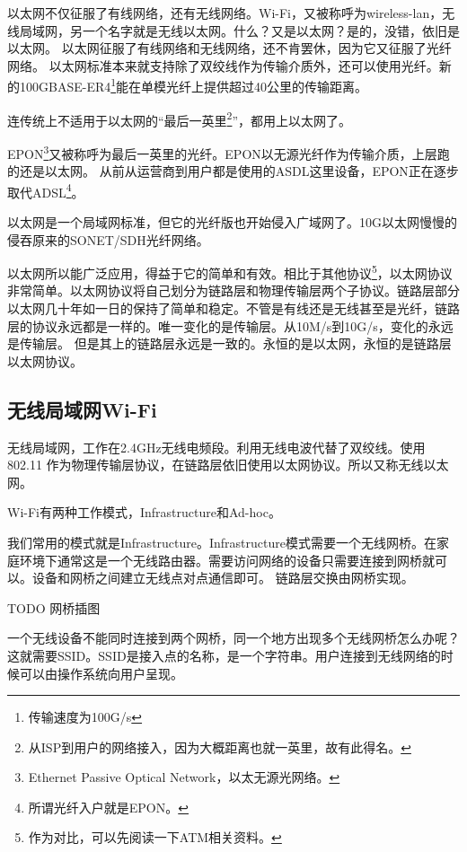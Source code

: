 以太网不仅征服了有线网络，还有无线网络。Wi-Fi，又被称呼为wireless-lan，无线局域网，另一个名字就是无线以太网。什么？又是以太网？是的，没错，依旧是以太网。
以太网征服了有线网络和无线网络，还不肯罢休，因为它又征服了光纤网络。
以太网标准本来就支持除了双绞线作为传输介质外，还可以使用光纤。新的100GBASE-ER4\footnote{传输速度为100G/s}能在单模光纤上提供超过40公里的传输距离。

连传统上不适用于以太网的“最后一英里\footnote{从ISP到用户的网络接入，因为大概距离也就一英里，故有此得名。}”，都用上以太网了。

EPON\footnote{Ethernet Passive Optical Network，以太无源光网络。}又被称呼为最后一英里的光纤。EPON以无源光纤作为传输介质，上层跑的还是以太网。
从前从运营商到用户都是使用的ASDL这里设备，EPON正在逐步取代ADSL\footnote{所谓光纤入户就是EPON。}。%

以太网是一个局域网标准，但它的光纤版也开始侵入广域网了。10G以太网慢慢的侵吞原来的SONET/SDH光纤网络。

以太网所以能广泛应用，得益于它的简单和有效。相比于其他协议\footnote{作为对比，可以先阅读一下ATM相关资料。}，以太网协议非常简单。以太网协议将自己划分为链路层和物理传输层两个子协议。链路层部分以太网几十年如一日的保持了简单和稳定。不管是有线还是无线甚至是光纤，链路层的协议永远都是一样的。唯一变化的是传输层。从10M/s到10G/s，变化的永远是传输层。
但是其上的链路层永远是一致的。永恒的是以太网，永恒的是链路层以太网协议。

\subsection{无线局域网Wi-Fi}

无线局域网，工作在2.4GHz无线电频段。利用无线电波代替了双绞线。使用 802.11 作为物理传输层协议，在链路层依旧使用以太网协议。所以又称无线以太网。

Wi-Fi有两种工作模式，Infrastructure和Ad-hoc。

我们常用的模式就是Infrastructure。Infrastructure模式需要一个无线网桥。在家庭环境下通常这是一个无线路由器。需要访问网络的设备只需要连接到网桥就可以。设备和网桥之间建立无线点对点通信即可。
链路层交换由网桥实现。

TODO 网桥插图 %

一个无线设备不能同时连接到两个网桥，同一个地方出现多个无线网桥怎么办呢？这就需要SSID。SSID是接入点的名称，是一个字符串。用户连接到无线网络的时候可以由操作系统向用户呈现。

